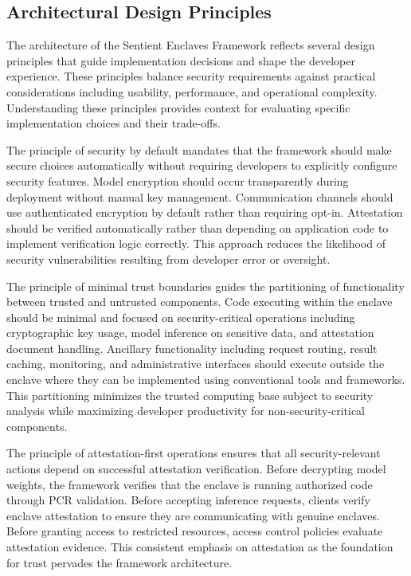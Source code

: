 \subsection{Architectural Design Principles}

The architecture of the Sentient Enclaves Framework reflects several design principles that guide implementation decisions and shape the developer experience. These principles balance security requirements against practical considerations including usability, performance, and operational complexity. Understanding these principles provides context for evaluating specific implementation choices and their trade-offs.

The principle of security by default mandates that the framework should make secure choices automatically without requiring developers to explicitly configure security features. Model encryption should occur transparently during deployment without manual key management. Communication channels should use authenticated encryption by default rather than requiring opt-in. Attestation should be verified automatically rather than depending on application code to implement verification logic correctly. This approach reduces the likelihood of security vulnerabilities resulting from developer error or oversight.

The principle of minimal trust boundaries guides the partitioning of functionality between trusted and untrusted components. Code executing within the enclave should be minimal and focused on security-critical operations including cryptographic key usage, model inference on sensitive data, and attestation document handling. Ancillary functionality including request routing, result caching, monitoring, and administrative interfaces should execute outside the enclave where they can be implemented using conventional tools and frameworks. This partitioning minimizes the trusted computing base subject to security analysis while maximizing developer productivity for non-security-critical components.

The principle of attestation-first operations ensures that all security-relevant actions depend on successful attestation verification. Before decrypting model weights, the framework verifies that the enclave is running authorized code through PCR validation. Before accepting inference requests, clients verify enclave attestation to ensure they are communicating with genuine enclaves. Before granting access to restricted resources, access control policies evaluate attestation evidence. This consistent emphasis on attestation as the foundation for trust pervades the framework architecture.

